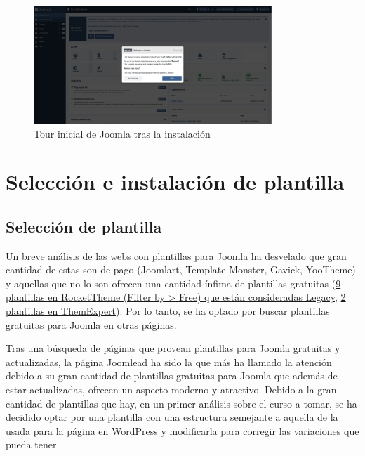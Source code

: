 \documentclass[a4paper]{article}
\newcommand{\textgap}{\vspace{1em}}
\begin{document}
\begin{figure}[H]
    \centering
    \includegraphics[width=0.8\textwidth]{images/install-6.png}
    \caption{Tour inicial de Joomla tras la instalación}
\end{figure}


\section{Selección e instalación de plantilla}

\subsection{Selección de plantilla}

Un breve análisis de las webs con plantillas para Joomla ha desvelado que gran cantidad de estas son de pago (Joomlart, Template Monster, Gavick, YooTheme) y aquellas que no lo son ofrecen una cantidad ínfima de plantillas gratuitas (\href{https://rockettheme.com/joomla/templates}{9 plantillas en RocketTheme (Filter by > Free) que están consideradas Legacy}, \href{https://www.themexpert.com/joomla-templates/tag/free}{2 plantillas en ThemExpert}). Por lo tanto, se ha optado por buscar plantillas gratuitas para Joomla en otras páginas.

\textgap

Tras una búsqueda de páginas que provean plantillas para Joomla gratuitas y actualizadas, la página \href{https://joomlead.com/joomla-template/}{Joomlead} ha sido la que más ha llamado la atención debido a su gran cantidad de plantillas gratuitas para Joomla que además de estar actualizadas, ofrecen un aspecto moderno y atractivo. Debido a la gran cantidad de plantillas que hay, en un primer análisis sobre el curso a tomar, se ha decidido optar por una plantilla con una estructura semejante a aquella de la usada para la página en WordPress y modificarla para corregir las variaciones que pueda tener.

\textgap
\end{document}

